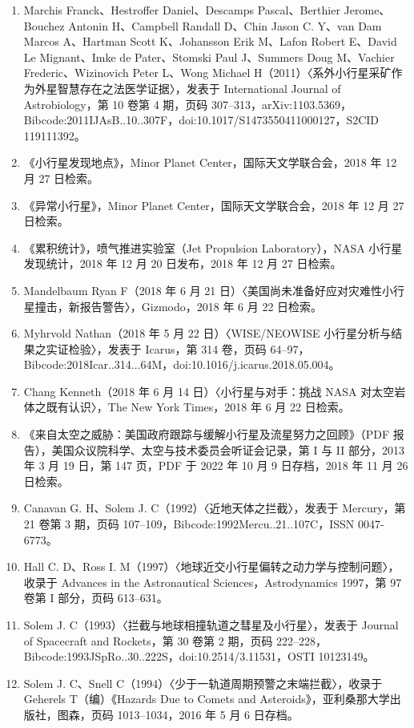 \begin{enumerate}
\item Marchis Franck、Hestroffer Daniel、Descamps Pascal、Berthier Jerome、Bouchez Antonin H、Campbell Randall D、Chin Jason C. Y、van Dam Marcos A、Hartman Scott K、Johansson Erik M、Lafon Robert E、David Le Mignant、Imke de Pater、Stomski Paul J、Summers Doug M、Vachier Frederic、Wizinovich Peter L、Wong Michael H（2011）〈系外小行星采矿作为外星智慧存在之法医学证据〉，发表于 International Journal of Astrobiology，第 10 卷第 4 期，页码 307–313，arXiv:1103.5369，Bibcode:2011IJAsB..10..307F，doi:10.1017/S1473550411000127，S2CID 119111392。
\item 《小行星发现地点》，Minor Planet Center，国际天文学联合会，2018 年 12 月 27 日检索。
\item 《异常小行星》，Minor Planet Center，国际天文学联合会，2018 年 12 月 27 日检索。
\item 《累积统计》，喷气推进实验室（Jet Propulsion Laboratory），NASA 小行星发现统计，2018 年 12 月 20 日发布，2018 年 12 月 27 日检索。
\item Mandelbaum Ryan F（2018 年 6 月 21 日）〈美国尚未准备好应对灾难性小行星撞击，新报告警告〉，Gizmodo，2018 年 6 月 22 日检索。
\item Myhrvold Nathan（2018 年 5 月 22 日）〈WISE/NEOWISE 小行星分析与结果之实证检验〉，发表于 Icarus，第 314 卷，页码 64–97，Bibcode:2018Icar..314...64M，doi:10.1016/j.icarus.2018.05.004。
\item Chang Kenneth（2018 年 6 月 14 日）〈小行星与对手：挑战 NASA 对太空岩体之既有认识〉，The New York Times，2018 年 6 月 22 日检索。
\item 《来自太空之威胁：美国政府跟踪与缓解小行星及流星努力之回顾》（PDF 报告），美国众议院科学、太空与技术委员会听证会记录，第 I 与 II 部分，2013 年 3 月 19 日，第 147 页，PDF 于 2022 年 10 月 9 日存档，2018 年 11 月 26 日检索。
\item Canavan G. H、Solem J. C（1992）〈近地天体之拦截〉，发表于 Mercury，第 21 卷第 3 期，页码 107–109，Bibcode:1992Mercu..21..107C，ISSN 0047-6773。
\item Hall C. D、Ross I. M（1997）〈地球近交小行星偏转之动力学与控制问题〉，收录于 Advances in the Astronautical Sciences，Astrodynamics 1997，第 97 卷第 I 部分，页码 613–631。
\item Solem J. C（1993）〈拦截与地球相撞轨道之彗星及小行星〉，发表于 Journal of Spacecraft and Rockets，第 30 卷第 2 期，页码 222–228，Bibcode:1993JSpRo..30..222S，doi:10.2514/3.11531，OSTI 10123149。
\item Solem J. C、Snell C（1994）〈少于一轨道周期预警之末端拦截〉，收录于 Geherels T（编）《Hazards Due to Comets and Asteroids》，亚利桑那大学出版社，图森，页码 1013–1034，2016 年 5 月 6 日存档。

\end{enumerate}
